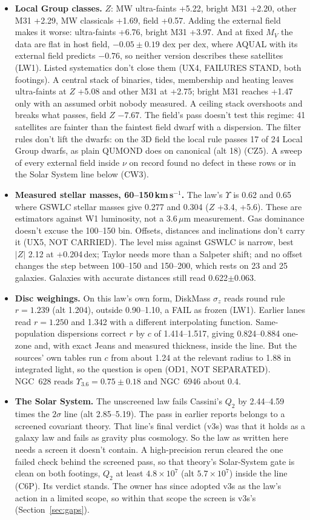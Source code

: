 \documentclass[10pt]{article}
\begin{document}
\begin{itemize}
\item \textbf{Local Group classes.} $Z$: MW ultra-faints +5.22, bright M31 +2.20, other M31 +2.29, MW classicals +1.69, field +0.57. Adding the external field makes it worse: ultra-faints +6.76, bright M31 +3.97. And at fixed $M_V$ the data are flat in host field, $-0.05\pm0.19$ dex per dex, where AQUAL with its external field predicts $-0.76$, so neither version describes these satellites (LW1). Listed systematics don't close them (UX4, FAILURES STAND, both footings). A central stack of binaries, tides, membership and heating leaves ultra-faints at $Z$ +5.08 and other M31 at +2.75; bright M31 reaches +1.47 only with an assumed orbit nobody measured. A ceiling stack overshoots and breaks what passes, field $Z$ $-7.67$. The field's pass doesn't test this regime: 41 satellites are fainter than the faintest field dwarf with a dispersion. The filter rules don't lift the dwarfs: on the 3D field the local rule passes 17 of 24 Local Group dwarfs, as plain QUMOND does on canonical (alt 18) (CZ5). A sweep of every external field inside $\nu$ on record found no defect in these rows or in the Solar System line below (CW3).
\item \textbf{Measured stellar masses, 60--150\,km\,s$^{-1}$.} The law's $\Upsilon$ is 0.62 and 0.65 where GSWLC stellar masses give 0.277 and 0.304 ($Z$ +3.4, +5.6). These are estimators against W1 luminosity, not a 3.6\,$\mu$m measurement. Gas dominance doesn't excuse the 100--150 bin. Offsets, distances and inclinations don't carry it (UX5, NOT CARRIED). The level miss against GSWLC is narrow, best $|Z|$ 2.12 at +0.204\,dex; Taylor needs more than a Salpeter shift; and no offset changes the step between 100--150 and 150--200, which rests on 23 and 25 galaxies. Galaxies with accurate distances still read 0.622$\pm$0.063.
\item \textbf{Disc weighings.} On this law's own form, DiskMass $\sigma_z$ reads round rule $r=1.239$ (alt 1.204), outside 0.90--1.10, a FAIL as frozen (LW1). Earlier lanes read $r=1.250$ and 1.342 with a different interpolating function. Same-population dispersions \cite{A16,A18,A21} correct $r$ by $c$ of 1.414--1.517, giving 0.824--0.884 one-zone and, with exact Jeans and measured thickness, inside the line. But the sources' own tables run $c$ from about 1.24 at the relevant radius to 1.88 in integrated light, so the question is open (OD1, NOT SEPARATED). NGC~628 reads $\Upsilon_{3.6}=0.75\pm0.18$ and NGC~6946 about 0.4.
\item \textbf{The Solar System.} The unscreened law fails Cassini's $Q_2$ by 2.44--4.59 times the $2\sigma$ line (alt 2.85--5.19). The pass in earlier reports belongs to a screened covariant theory. That line's final verdict (v3s) was that it holds as a galaxy law and fails as gravity plus cosmology. So the law as written here needs a screen it doesn't contain. A high-precision rerun cleared the one failed check behind the screened pass, so that theory's Solar-System gate is clean on both footings, $Q_2$ at least $4.8\times10^7$ (alt $5.7\times10^7$) inside the line (C6P). Its verdict stands. The owner has since adopted v3s as the law's action in a limited scope, so within that scope the screen is v3s's (Section~\ref{sec:gaps}).

\end{itemize}
\end{document}
